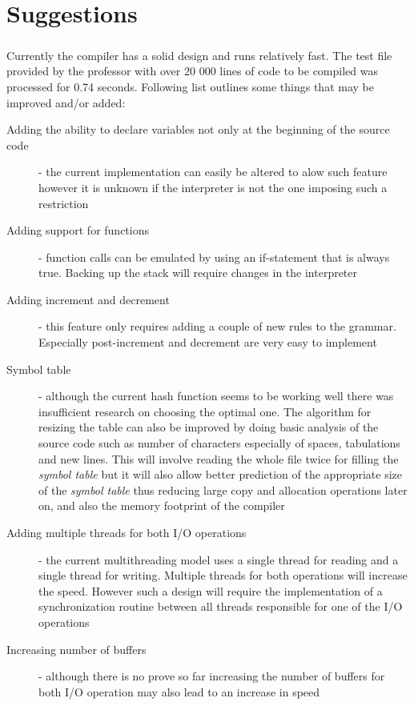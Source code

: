 \chapter{Suggestions}
\paragraph{}
  Currently the compiler has a solid design and runs relatively fast. The test file provided by the professor with over 20 000 lines of code to be compiled was processed for 0.74 seconds. Following list outlines some things that may be improved and/or added:
  \begin{description}
  	\item[Adding the ability to declare variables not only at the beginning of the source code] - the current implementation can easily be altered to alow such feature however it is unknown if the interpreter is not the one imposing such a restriction
  	\item[Adding support for functions] - function calls can be emulated by using an if-statement that is always true. Backing up the stack will require changes in the interpreter
  	\item[Adding increment and decrement] - this feature only requires adding a couple of new rules to the grammar. Especially post-increment and decrement are very easy to implement
  	\item[Symbol table] - although the current hash function seems to be working well there was insufficient research on choosing the optimal one. The algorithm for resizing the table can also be improved by doing basic analysis of the source code such as number of characters especially of spaces, tabulations and new lines. This will involve reading the whole file twice for filling the \textit{symbol table} but it will also allow better prediction of the appropriate size of the \textit{symbol table} thus reducing large copy and allocation operations later on, and also the memory footprint of the compiler
  	\item[Adding multiple threads for both I/O operations] - the current multithreading model uses a single thread for reading and a single thread for writing. Multiple threads for both operations will increase the speed. However such a design will require the implementation of a synchronization routine between all threads responsible for one of the I/O operations
  	\item[Increasing number of buffers] - although there is no prove so far increasing the number of buffers for both I/O operation may also lead to an increase in speed

\end{description}
